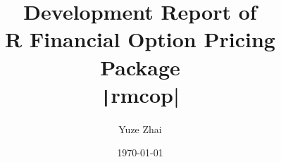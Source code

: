 \title{Development Report of\\R Financial Option Pricing Package\\\texttt|rmcop|}
\author{Yuze Zhai}
\date{\today}

\maketitle
\newpage
\tableofcontents
\newpage
